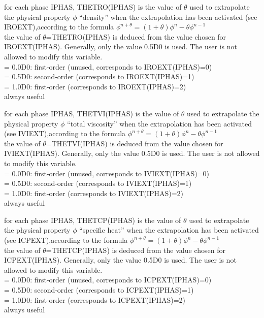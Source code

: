 {for each phase IPHAS, THETRO(IPHAS) is the value of $\theta$ used to
extrapolate the physical property $\phi$ ``density'' when the extrapolation has
been activated (see IROEXT),according to the
formula $\phi^{n+\theta}=(1+\theta)\phi^n-\theta \phi^{n-1}$\\
the value of $\theta$=THETRO(IPHAS) is deduced from the value chosen for
IROEXT(IPHAS). Generally, only the value 0.5D0 is used. The user is not
allowed to modify this variable.\\
\hspace*{1.3cm}= 0.0D0: first-order (unused, corresponds to
IROEXT(IPHAS)=0)\\
\hspace*{1.3cm}= 0.5D0: second-order (corresponds to IROEXT(IPHAS)=1) \\
\hspace*{1.3cm}= 1.0D0: first-order (corresponds to IROEXT(IPHAS)=2) \\
always useful}

{for each phase IPHAS, THETVI(IPHAS) is the value of $\theta$ used to
extrapolate the physical property $\phi$ ``total viscosity'' when the extrapolation has
been activated (see IVIEXT),according to the
formula $\phi^{n+\theta}=(1+\theta)\phi^n-\theta \phi^{n-1}$\\
the value of $\theta$=THETVI(IPHAS) is deduced from the value chosen for
IVIEXT(IPHAS). Generally, only the value 0.5D0 is used. The user is not
allowed to modify this variable.\\
\hspace*{1.3cm}= 0.0D0: first-order (unused, corresponds to
IVIEXT(IPHAS)=0)\\
\hspace*{1.3cm}= 0.5D0: second-order (corresponds to IVIEXT(IPHAS)=1) \\
\hspace*{1.3cm}= 1.0D0: first-order (corresponds to IVIEXT(IPHAS)=2) \\
always useful}

{for each phase IPHAS, THETCP(IPHAS) is the value of $\theta$ used to
extrapolate the physical property $\phi$ ``specific heat'' when the extrapolation has
been activated (see ICPEXT),according to the
formula $\phi^{n+\theta}=(1+\theta)\phi^n-\theta \phi^{n-1}$\\
the value of $\theta$=THETCP(IPHAS) is deduced from the value chosen for
ICPEXT(IPHAS). Generally, only the value 0.5D0 is used. The user is not
allowed to modify this variable.\\
\hspace*{1.3cm}= 0.0D0: first-order (unused, corresponds to
ICPEXT(IPHAS)=0)\\
\hspace*{1.3cm}= 0.5D0: second-order (corresponds to ICPEXT(IPHAS)=1) \\
\hspace*{1.3cm}= 1.0D0: first-order (corresponds to ICPEXT(IPHAS)=2) \\
always useful}

